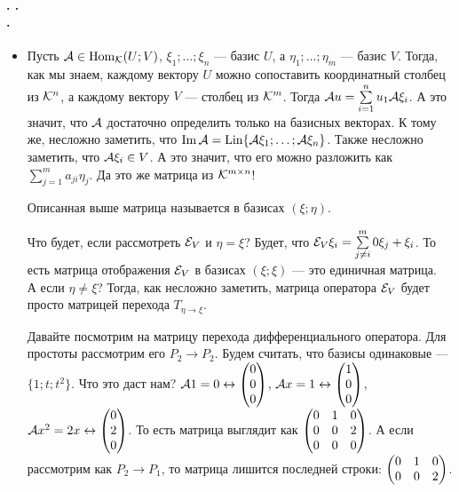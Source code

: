 \documentclass{article}
\DeclareMathOperator{\operIm}{Im}
\let\Im\operIm
\newcommand*{\id}{{\scriptE}}
\begin{document}
    \paragraph{. .\\.}
    \begin{itemize}
        \item[]
        \begin{Comment}
            Пусть ${\mathcal{A}}\in\operatorname{Hom}_{\mathcal{K}}(U;V)$, $\xi_1;\ldots;\xi_n$ --- базис $U$, а $\eta_1;\ldots;\eta_m$ --- базис $V$. Тогда, как мы знаем, каждому вектору $U$ можно сопоставить координатный столбец из ${\mathcal{K}}^n$, а каждому вектору $V$ --- столбец из ${\mathcal{K}}^m$. Тогда ${\mathcal{A}} u=\sum\limits_{i=1}^nu_1{\mathcal{A}}\xi_i$. А это значит, что ${\mathcal{A}}$ достаточно определить только на базисных векторах. К тому же, несложно заметить, что $\Im\scriptA=\Lin\{\scriptA\xi_1;\ldots;\scriptA\xi_n\}$. Также несложно заметить, что ${\mathcal{A}}\xi_i\in V$. А это значит, что его можно разложить как $\sum\limits_{j=1}^ma_{ji}\eta_j$. Да это же матрица из ${\mathcal{K}}^{m\times n}$!
        \end{Comment}
        \dfn Описанная выше матрица называется  в базисах $(\xi;\eta)$.
        \begin{Example}
            Что будет, если рассмотреть $\id_V$ и $\eta=\xi$? Будет, что $\id_V\xi_i=\sum\limits_{j\neq i}^m0\xi_j+\xi_i$. То есть матрица отображения $\id_V$ в базисах $(\xi;\xi)$ --- это единичная матрица.\\
            А если $\eta\neq\xi$? Тогда, как несложно заметить, матрица оператора $\id_V$ будет просто матрицей перехода $T_{\eta\to\xi}$.
        \end{Example}
        \begin{Example}
            Давайте посмотрим на матрицу перехода дифференциального оператора. Для простоты рассмотрим его $P_2\to P_2$. Будем считать, что базисы одинаковые --- $\{1;t;t^2\}$. Что это даст нам? ${\mathcal{A}}1=0\leftrightarrow\left(\begin{matrix}0\\0\\0\end{matrix}\right)$, ${\mathcal{A}} x=1\leftrightarrow\left(\begin{matrix}1\\0\\0\end{matrix}\right)$, ${\mathcal{A}} x^2=2x\leftrightarrow\left(\begin{matrix}0\\2\\0\end{matrix}\right)$. То есть матрица выглядит как $\left(\begin{matrix}0 & 1 & 0\\0 & 0 & 2\\0 & 0 & 0\end{matrix}\right)$. А если рассмотрим как $P_2\to P_1$, то матрица лишится последней строки: $\left(\begin{matrix}0 & 1 & 0\\0 & 0 & 2\end{matrix}\right)$.

\end{Example}
\end{itemize}
\end{document}

